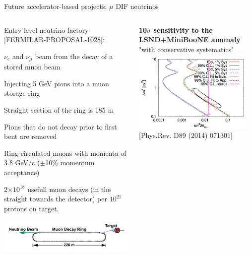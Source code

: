 \begin{frame}[t]{Future accelerator-based projects: $\mu$ DIF neutrinos}

\begin{columns}[t]
  \begin{column}{0.50\textwidth}
   {\scriptsize
     Entry-level neutrino factory {\color{blue}[FERMILAB-PROPOSAL-1028]}:
     \begin{itemize}
     {\scriptsize
       \item $\nu_{e}$ and $\nu_{\mu}$ beam from the decay of a stored muon beam
       \item Injecting 5 GeV pions into a muon storage ring
       \item Straight section of the ring is 185 m
       \item Pions that do not decay prior to first bent are removed
       \item Ring circulated muons with momenta of 3.8 GeV/c ($\pm$10\% momentum acceptance)
       \item 2$\times 10^{18}$ usefull muon decays (in the straight towards the detector)
             per $10^{21}$ protons on target.\\
     }
     \end{itemize}
     }
     \includegraphics[width=0.99\textwidth]{./images/beyond3nu/future/nustorm.png}
  \end{column}
  \begin{column}{0.50\textwidth}
    \centering
     {\bf 10$\sigma$ sensitivity to the LSND+MiniBooNE anomaly} "with conservative systematics"\\
     \vspace{0.2cm}
     \includegraphics[width=0.95\textwidth]{./images/beyond3nu/future/nustorm_sensitivity.png}\\
     {\scriptsize \color{blue}[Phys.Rev. D89 (2014) 071301]}\\
  \end{column}
\end{columns}
\end{frame}


